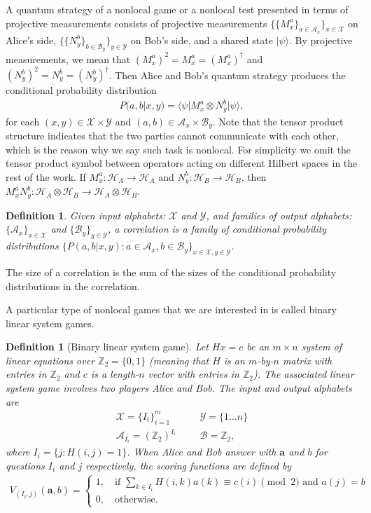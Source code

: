\documentclass[11pt,letterpaper]{article}
\newcommand{\ket}[1]{|#1\rangle}
\newcommand{\bra}[1]{\langle#1|}
\newcommand{\x}{\otimes}
\newcommand{\Z}{\mathbb{Z}}
\newcommand{\calH}{\mathcal{H}}
\newcommand{\calX}{\mathcal{X}}
\newcommand{\calY}{\mathcal{Y}}
\newcommand{\calA}{\mathcal{A}}
\newcommand{\calB}{\mathcal{B}}
\newcommand{\1}{\mathbb{1}}
\newcommand{\ba}{\pmb{a}}
\newcommand{\pr}[2]{P(#1|#2)}
\newtheorem{definition}[theorem]{Definition}
\theoremstyle{definition}
\begin{document}
A quantum strategy of a nonlocal game or a nonlocal test presented in terms of projective measurements
consists of projective measurements $\{\{M_x^a\}_{a \in \calA_x} \}_{x \in \calX}$ on Alice's side, 
$\{\{N_y^b\}_{b \in \calB_y} \}_{y \in \calY}$ on Bob's side, and a shared state $\ket{\psi}$. 
By projective measurements, we mean that  
$(M_x^a)^2 = M_x^a = (M_x^a)^\dagger$ and $(N_y^b)^2 = N_y^b = (N_y^b)^\dagger$.
Then Alice and Bob's quantum strategy produces the conditional probability distribution
\begin{align}
	\pr{a,b}{x,y} = \bra{\psi} M_x^a \x N_y^b \ket{\psi},
\end{align}
for each $(x,y) \in \calX \times \calY$ and $(a,b) \in \calA_x \times \calB_y$.
Note that the tensor product structure indicates that the
two parties cannot communicate with each other, 
which is the reason why we say such task is nonlocal.
For simplicity we omit the tensor product symbol between operators 
acting on different Hilbert spaces in the rest of the work. 
If $M_x^a : \calH_A \rightarrow \calH_A$ and $N_y^b: 
\calH_B \rightarrow \calH_B$, 
then $M_x^a N_y^b: \calH_A\x \calH_B \rightarrow \calH_A \x \calH_B$.
\begin{definition}
	Given input alphabets: $\calX$ and $\calY$, and families of output
	alphabets: $\{\calA_x\}_{x \in \calX}$ and $\{\calB_y\}_{y \in \calY}$, a correlation is a family of conditional probability distributions
	$\{\pr{a,b}{x,y}: a \in \calA_x, b \in \calB_y\}_{x \in \calX, y \in \calY}$.  
\end{definition}
The size of a correlation is the sum of the sizes of the conditional probability distributions in the correlation.

A particular type of nonlocal games that we are interested in is called binary linear system games.
\begin{definition}[Binary linear system game]
 Let $Hx = c$ be an $m \times n$ system of linear equations over $\Z_2 = \{0, 1\}$ (meaning that $H$ is an $m$-by-$n$ matrix with entries in $\Z_2$ and 
 $c$ is a length-$n$ vector with entries in $\Z_2$). 
 The associated linear system game involves two
 players Alice and Bob. 
 The input and output alphabets are 
 \begin{align*}
     \calX = \{I_i\}_{i=1}^m && &\calY = \{1 \dots n\} \\
     \calA_{I_i} = (\Z_2)^{I_i} && &\calB = \Z_2,
 \end{align*}
 where $I_i = \{j : H(i,j) = 1\}$.
 When Alice and Bob answer with $\ba$ and $b$ for questions $I_i$ and
 $j$ respectively,
 the scoring functions are defined by
 \begin{align}
 	V_{(I_i,j)}(\ba, b) =
	\begin{cases}
		1, \quad \text{if } \sum_{k \in I_i} H(i,k) a(k) \equiv c(i) \pmod 2 \text{ and } a(j) = b \\
		0,  \quad \text{otherwise.}
	\end{cases}
\end{align}
\end{definition}
\end{document}
